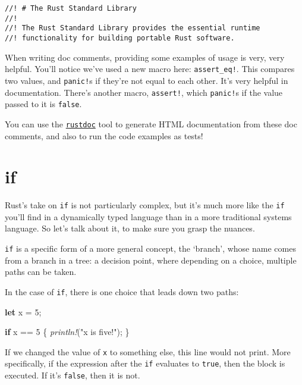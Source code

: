 \documentclass[a4paper,]{book}
\newenvironment{Shaded}{\begin{snugshade}}{\end{snugshade}}
\newcommand{\KeywordTok}[1]{\textcolor[rgb]{0.13,0.29,0.53}{\textbf{{#1}}}}
\newcommand{\DecValTok}[1]{\textcolor[rgb]{0.00,0.00,0.81}{{#1}}}
\newcommand{\StringTok}[1]{\textcolor[rgb]{0.31,0.60,0.02}{{#1}}}
\newcommand{\PreprocessorTok}[1]{\textcolor[rgb]{0.56,0.35,0.01}{\textit{{#1}}}}
\newcommand{\NormalTok}[1]{{#1}}
\begin{document}
\begin{verbatim}
//! # The Rust Standard Library
//!
//! The Rust Standard Library provides the essential runtime
//! functionality for building portable Rust software.
\end{verbatim}

When writing doc comments, providing some examples of usage is very,
very helpful. You'll notice we've used a new macro here:
\texttt{assert\_eq!}. This compares two values, and \texttt{panic!}s if
they're not equal to each other. It's very helpful in documentation.
There's another macro, \texttt{assert!}, which \texttt{panic!}s if the
value passed to it is \texttt{false}.

You can use the \protect\hyperlink{sec--documentation}{\texttt{rustdoc}}
tool to generate HTML documentation from these doc comments, and also to
run the code examples as tests!

\hypertarget{sec--if}{\section{if}\label{sec--if}}

Rust's take on \texttt{if} is not particularly complex, but it's much
more like the \texttt{if} you'll find in a dynamically typed language
than in a more traditional systems language. So let's talk about it, to
make sure you grasp the nuances.

\texttt{if} is a specific form of a more general concept, the `branch',
whose name comes from a branch in a tree: a decision point, where
depending on a choice, multiple paths can be taken.

In the case of \texttt{if}, there is one choice that leads down two
paths:

\begin{Shaded}
\begin{Highlighting}[]
\KeywordTok{let} \NormalTok{x = }\DecValTok{5}\NormalTok{;}

\KeywordTok{if} \NormalTok{x == }\DecValTok{5} \NormalTok{\{}
    \PreprocessorTok{println!}\NormalTok{(}\StringTok{"x is five!"}\NormalTok{);}
\NormalTok{\}}
\end{Highlighting}
\end{Shaded}

If we changed the value of \texttt{x} to something else, this line would
not print. More specifically, if the expression after the \texttt{if}
evaluates to \texttt{true}, then the block is executed. If it's
\texttt{false}, then it is not.
\end{document}
